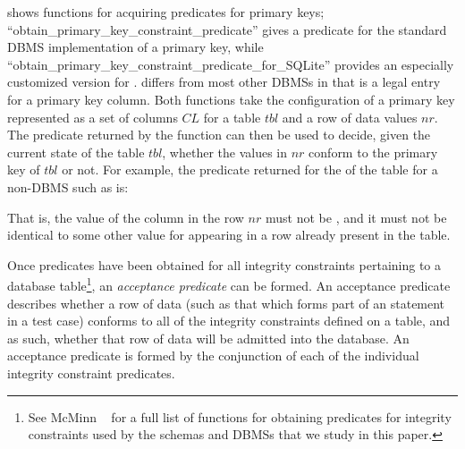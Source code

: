 \begin{sloppypar}
 shows functions for acquiring predicates for primary keys;
\mbox{``obtain\_primary\_key\_constraint\_predicate''} gives a predicate for the standard DBMS implementation of a primary key,
while \mbox{``obtain\_primary\_key\_constraint\_predicate\_for\_SQLite''} provides an especially customized version for \SQLite. \SQLite
differs from most other DBMSs in that \NULL is a legal entry for a primary key column. Both functions take the
configuration of a primary key represented as a set of columns $CL$ for a table $tbl$ and a row of data values $nr$. The
predicate returned by the function can then be used to decide, given the current state of the table $tbl$, whether the
values in $nr$ conform to the primary key of $tbl$ or not. For example, the predicate returned for the \PK of the
 table for a non-\SQLite DBMS such as \Postgres is:
\end{sloppypar}

\vspace{-.6em}
\begin{center}
\end{center}
\vspace{-.6em}

\noindent That is, the value of the  column in the row $nr$ must not be \NULL, and it must not be identical to some other value for  appearing in a row already present in the  table.



Once predicates have been obtained for all integrity constraints pertaining to a database table\footnote{{\scriptsize See McMinn \etal~\cite{McMinn2015} for a full list of functions for obtaining predicates for integrity constraints used by the schemas and DBMSs that we study in this paper.}}, an {\it acceptance predicate} can be formed. An acceptance predicate describes whether a row of data (such as that which forms part of an \INSERT statement in a test case) conforms to all of the integrity constraints defined on a table, and as such, whether that row of data will be admitted into the database. An acceptance predicate is formed by the conjunction of each of the individual integrity constraint predicates.

